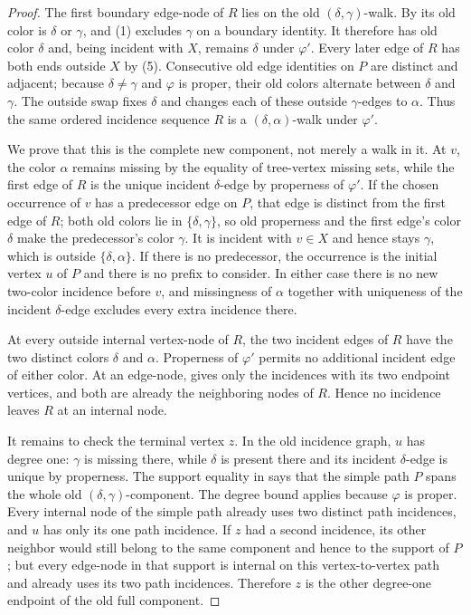 \begin{proof}
The first boundary edge-node of $R$ lies on the old
$(\delta,\gamma)$-walk.  By  its old
color is $\delta$ or $\gamma$, and (1) excludes $\gamma$ on a boundary
identity.  It therefore has old color $\delta$ and, being incident with
$X$, remains $\delta$ under $\varphi'$.  Every later edge of $R$ has both
ends outside $X$ by (5).  Consecutive old edge identities on $P$ are
distinct and adjacent; because $\delta\ne\gamma$ and $\varphi$ is
proper, their old colors alternate between $\delta$ and $\gamma$.
The outside swap fixes $\delta$ and changes each of these outside
$\gamma$-edges to $\alpha$.  Thus the same ordered incidence sequence
$R$ is a $(\delta,\alpha)$-walk under $\varphi'$.

We prove that this is the complete new component, not merely a walk in
it.  At $v$, the color $\alpha$ remains missing by the equality of
tree-vertex missing sets, while the first edge of $R$ is the unique
incident $\delta$-edge by properness of $\varphi'$.  If the chosen
occurrence of $v$ has a predecessor edge on $P$, that edge is distinct
from the first edge of $R$; both old colors lie in
$\{\delta,\gamma\}$, so old properness and the first edge's color
$\delta$ make the predecessor's color $\gamma$.  It is incident with
$v\in X$ and hence stays $\gamma$, which is outside
$\{\delta,\alpha\}$.  If there is no predecessor, the occurrence is the
initial vertex $u$ of $P$ and there is no prefix to consider.  In either
case there is no new two-color incidence before $v$, and missingness of
$\alpha$ together with uniqueness of the incident $\delta$-edge excludes
every extra incidence there.

At every outside internal vertex-node of $R$, the two incident edges of
$R$ have the two distinct colors $\delta$ and $\alpha$.  Properness of
$\varphi'$ permits no additional incident edge of either color.  At an
edge-node,  gives only the incidences with
its two endpoint vertices, and both are already the neighboring nodes of
$R$.  Hence no incidence leaves $R$ at an internal node.

It remains to check the terminal vertex $z$.  In the old incidence graph,
$u$ has degree one: $\gamma$ is missing there, while $\delta$ is present
there and its incident $\delta$-edge is unique by properness.  The
support equality in  says that the
simple path $P$ spans the whole old $(\delta,\gamma)$-component.  The
degree bound  applies because
$\varphi$ is proper.  Every internal node of the simple path already uses
two distinct path incidences, and $u$ has only its one path incidence.
If $z$ had a second incidence, its other neighbor would still belong to
the same component and hence to the support of $P$; but every edge-node
in that support is internal on this vertex-to-vertex path and already
uses its two path incidences.  Therefore $z$ is the other degree-one
endpoint of the old full component.


\end{proof}
